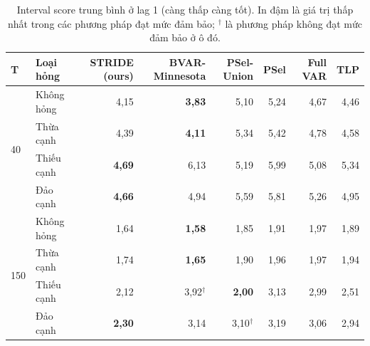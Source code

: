 \begin{table}[H]
\centering
\caption{Interval score trung bình ở lag 1 (càng thấp càng tốt). In đậm là giá trị thấp nhất trong các phương pháp đạt mức đảm bảo; $^{\dagger}$ là phương pháp không đạt mức đảm bảo ở ô đó.}\label{tab:cmp-is}
{\small
\begin{tabular}{llrrrrrr}
\toprule
T & Loại hỏng & STRIDE (ours) & BVAR-Minnesota & PSel-Union & PSel & Full VAR & TLP \\
\midrule
\multirow{4}{*}{40} & Không hỏng & 4,15 & \textbf{3,83} & 5,10 & 5,24 & 4,67 & 4,46 \\
 & Thừa cạnh & 4,39 & \textbf{4,11} & 5,34 & 5,42 & 4,78 & 4,58 \\
 & Thiếu cạnh & \textbf{4,69} & 6,13 & 5,19 & 5,99 & 5,08 & 5,34 \\
 & Đảo cạnh & \textbf{4,66} & 4,94 & 5,59 & 5,81 & 5,26 & 4,95 \\
\midrule
\multirow{4}{*}{150} & Không hỏng & 1,64 & \textbf{1,58} & 1,85 & 1,91 & 1,97 & 1,89 \\
 & Thừa cạnh & 1,74 & \textbf{1,65} & 1,90 & 1,96 & 1,97 & 1,94 \\
 & Thiếu cạnh & 2,12 & 3,92$^{\dagger}$ & \textbf{2,00} & 3,13 & 2,99 & 2,51 \\
 & Đảo cạnh & \textbf{2,30} & 3,14 & 3,10$^{\dagger}$ & 3,19 & 3,06 & 2,94 \\
\bottomrule
\end{tabular}
}
\end{table}
